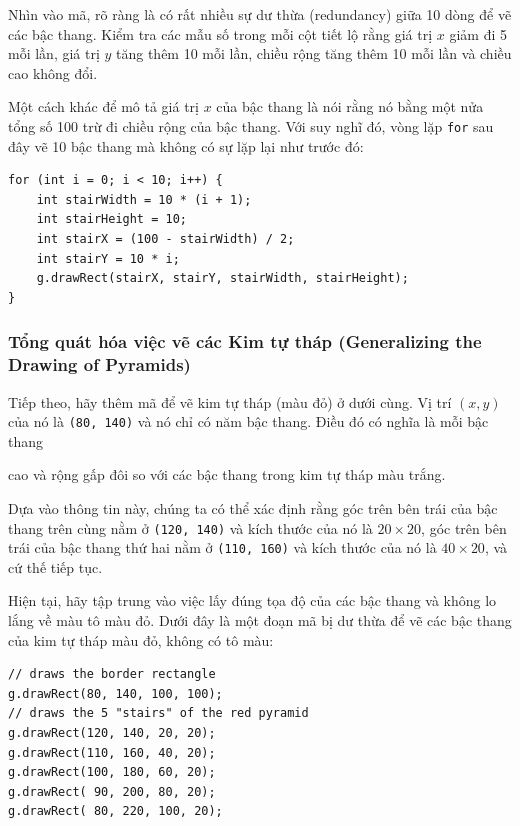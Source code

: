 Nhìn vào mã, rõ ràng là có rất nhiều sự dư thừa (redundancy) giữa 10
dòng để vẽ các bậc thang. Kiểm tra các mẫu số trong mỗi cột tiết lộ rằng
giá trị \(x\) giảm đi 5 mỗi lần, giá trị \(y\) tăng thêm 10 mỗi lần,
chiều rộng tăng thêm 10 mỗi lần và chiều cao không đổi.

Một cách khác để mô tả giá trị \(x\) của bậc thang là nói rằng nó bằng
một nửa tổng số 100 trừ đi chiều rộng của bậc thang. Với suy nghĩ đó,
vòng lặp \texttt{for} sau đây vẽ 10 bậc thang mà không có sự lặp lại như
trước đó:

\begin{verbatim}
for (int i = 0; i < 10; i++) {
    int stairWidth = 10 * (i + 1);
    int stairHeight = 10;
    int stairX = (100 - stairWidth) / 2;
    int stairY = 10 * i;
    g.drawRect(stairX, stairY, stairWidth, stairHeight);
}
\end{verbatim}

\subsubsection{Tổng quát hóa việc vẽ các Kim tự tháp (Generalizing the
Drawing of
Pyramids)}\label{tux1ed5ng-quuxe1t-huxf3a-viux1ec7c-vux1ebd-cuxe1c-kim-tux1ef1-thuxe1p-generalizing-the-drawing-of-pyramids}

Tiếp theo, hãy thêm mã để vẽ kim tự tháp (màu đỏ) ở dưới cùng. Vị trí
\((x, y)\) của nó là \texttt{(80,\ 140)} và nó chỉ có năm bậc thang.
Điều đó có nghĩa là mỗi bậc thang

cao và rộng gấp đôi so với các bậc thang trong kim tự tháp màu trắng.

Dựa vào thông tin này, chúng ta có thể xác định rằng góc trên bên trái
của bậc thang trên cùng nằm ở \texttt{(120,\ 140)} và kích thước của nó
là \(20 \times 20\), góc trên bên trái của bậc thang thứ hai nằm ở
\texttt{(110,\ 160)} và kích thước của nó là \(40 \times 20\), và cứ thế
tiếp tục.

Hiện tại, hãy tập trung vào việc lấy đúng tọa độ của các bậc thang và
không lo lắng về màu tô màu đỏ. Dưới đây là một đoạn mã bị dư thừa để vẽ
các bậc thang của kim tự tháp màu đỏ, không có tô màu:

\begin{verbatim}
// draws the border rectangle
g.drawRect(80, 140, 100, 100);
// draws the 5 "stairs" of the red pyramid
g.drawRect(120, 140, 20, 20);
g.drawRect(110, 160, 40, 20);
g.drawRect(100, 180, 60, 20);
g.drawRect( 90, 200, 80, 20);
g.drawRect( 80, 220, 100, 20);
\end{verbatim}

